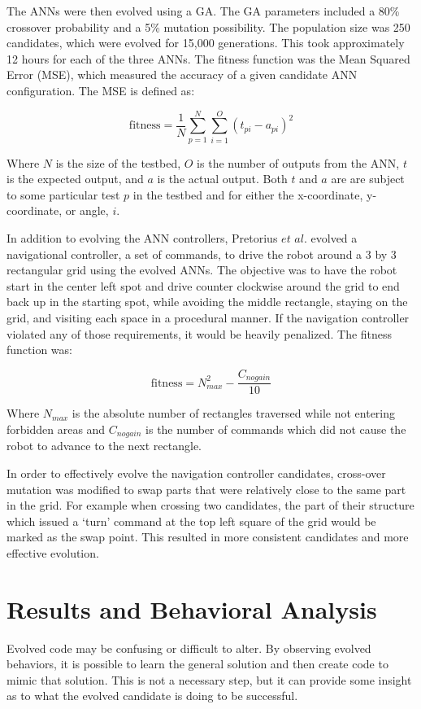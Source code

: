 \documentclass{sig-alternate}
\begin{document}
  The ANNs were then evolved using a GA. The GA parameters included a 80\% crossover probability and a 5\% mutation possibility. The population size was 250 candidates, which were evolved for 15,000 generations. This took approximately 12 hours for each of the three ANNs. The fitness function was the Mean Squared Error (MSE), which measured the accuracy of a given candidate ANN configuration. The MSE is defined as:
  
  \[
  \textrm{fitness} = \frac{1}{N}\sum\limits_{p=1}^N\sum\limits_{i=1}^O (t_{pi} - a_{pi})^2
\] 

  Where $N$ is the size of the testbed, $O$ is the number of outputs from the ANN, $t$ is the expected output, and $a$ is the actual output. Both $t$ and $a$ are are subject to some particular test $p$ in the testbed and for either the x-coordinate, y-coordinate, or angle, $i$.
  
  In addition to evolving the ANN controllers, Pretorius $et$ $al.$ evolved a  navigational controller, a set of commands, to drive the robot around a 3 by 3 rectangular grid using the evolved ANNs. The objective was to have the robot start in the center left spot and drive counter clockwise around the grid to end back up in the starting spot, while avoiding the middle rectangle, staying on the grid, and visiting each space in a procedural manner. If the navigation controller violated any of those requirements, it would be heavily penalized. The fitness function was:


\[
  \textrm{fitness} = N_{max}^2 - \frac{C_{nogain}}{10}
\] 

Where $N_{max}$ is the absolute number of rectangles traversed while not entering forbidden areas and $C_{nogain}$ is the number of commands which did not cause the robot to advance to the next rectangle.

	In order to effectively evolve the navigation controller candidates, cross-over mutation was modified to swap parts that were relatively close to the same part in the grid. For example when crossing two candidates, the part of their structure which issued a `turn' command at the top left square of the grid would be marked as the swap point. This resulted in more consistent candidates and more effective evolution. 
\section{Results and Behavioral Analysis}\label{behavior}

  Evolved code may be confusing or difficult to alter. By observing evolved behaviors, it is possible to learn the general solution and then create code to mimic that solution. This is not a necessary step, but it can provide some insight as to what the evolved candidate is doing to be successful.
\end{document}
